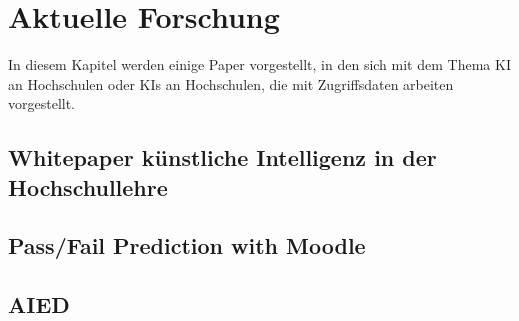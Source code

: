 \chapter{Aktuelle Forschung}
In diesem Kapitel werden einige Paper vorgestellt, in den sich mit dem Thema KI an Hochschulen oder KIs an Hochschulen, die mit Zugriffsdaten arbeiten vorgestellt.

\section{Whitepaper künstliche Intelligenz in der Hochschullehre}

\section{Pass/Fail Prediction with Moodle}

\section{AIED}
